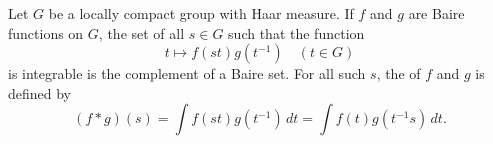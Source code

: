 \begin{definition}
Let $G$ be a locally compact group with Haar measure. If $f$ and $g$ are Baire functions on $G$, the set of all $s \in G$ such that the function
$$t \mapsto f(st)g(t^{-1}) \quad (t \in G)$$
is integrable is the complement of a Baire set. For all such $s$, the  of $f$ and $g$ is defined by
$$(f * g)(s) = \int f(st)g(t^{-1})\, dt = \int f(t)g(t^{-1}s)\, dt.$$
\end{definition}
